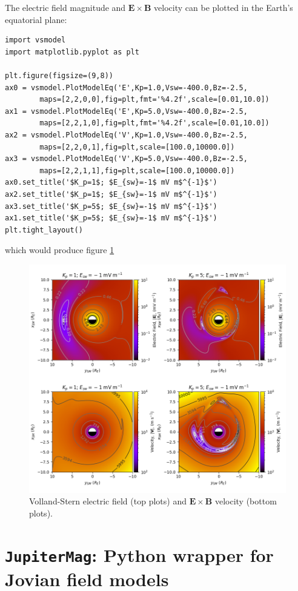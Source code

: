 			The electric field magnitude and $\mathbf{E}\times\mathbf{B}$ velocity can be plotted in the Earth's equatorial plane:
			\begin{verbatim}
import vsmodel
import matplotlib.pyplot as plt

plt.figure(figsize=(9,8))
ax0 = vsmodel.PlotModelEq('E',Kp=1.0,Vsw=-400.0,Bz=-2.5,
		maps=[2,2,0,0],fig=plt,fmt='%4.2f',scale=[0.01,10.0])
ax1 = vsmodel.PlotModelEq('E',Kp=5.0,Vsw=-400.0,Bz=-2.5,
		maps=[2,2,1,0],fig=plt,fmt='%4.2f',scale=[0.01,10.0])
ax2 = vsmodel.PlotModelEq('V',Kp=1.0,Vsw=-400.0,Bz=-2.5,
		maps=[2,2,0,1],fig=plt,scale=[100.0,10000.0])
ax3 = vsmodel.PlotModelEq('V',Kp=5.0,Vsw=-400.0,Bz=-2.5,
		maps=[2,2,1,1],fig=plt,scale=[100.0,10000.0])
ax0.set_title('$K_p=1$; $E_{sw}=-1$ mV m$^{-1}$')
ax2.set_title('$K_p=1$; $E_{sw}=-1$ mV m$^{-1}$')
ax3.set_title('$K_p=5$; $E_{sw}=-1$ mV m$^{-1}$')
ax1.set_title('$K_p=5$; $E_{sw}=-1$ mV m$^{-1}$')
plt.tight_layout()
			\end{verbatim}
			which would produce figure \ref{figVS}

			\begin{figure}
				\centering\includegraphics[width=\textwidth]{figures/ch03_vsmodel.png}
				\caption{Volland-Stern electric field (top plots) and $\mathbf{E}\times\mathbf{B}$ velocity (bottom plots). \label{figVS}}
			\end{figure}

	\section{\texttt{JupiterMag}: Python wrapper for Jovian field models}

